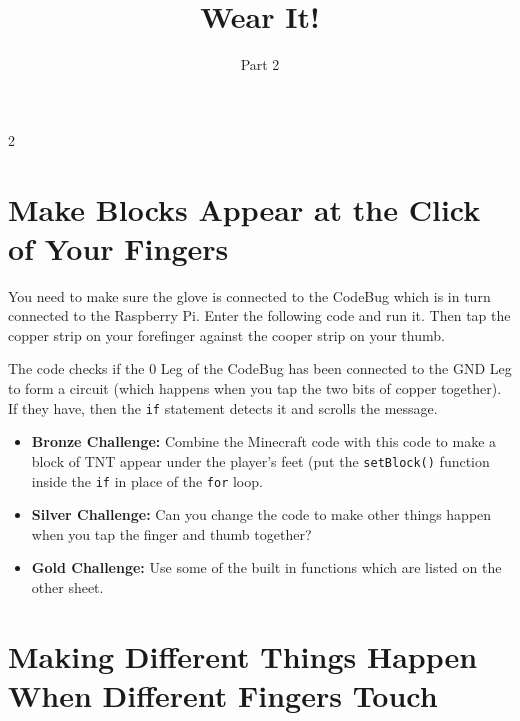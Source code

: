 \documentclass{geocraft-worksheet-multipage}
\begin{document}
\title{Wear It!}
\subtitle{Part 2}

\date{}

\maketitle

\setcounter {section} {2}

\section{Make Blocks Appear at the Click of  Your Fingers}
\lstset{language=Python}

You need to make sure the glove is connected to the CodeBug which is in turn connected to the Raspberry Pi. Enter the
following code and run it. Then tap the copper strip on your forefinger against the cooper strip on your thumb.

\noindent%
%
\vspace{0.2cm}
%
%

\noindent The code checks if the 0 Leg of the CodeBug has been connected to the GND Leg to form a circuit (which happens
when you tap the two bits of copper together). If they have, then the \lstinline{if} statement detects it and scrolls the
message.

\begin{itemize}
\item\textbf{Bronze Challenge:} Combine the Minecraft code with this code to make a block of TNT appear under the
  player's feet (put the \lstinline{setBlock()} function inside the \lstinline{if} in place of the \lstinline{for}
  loop. 
\item\textbf{Silver Challenge:} Can you change the code to make other things happen when you tap the finger and thumb
  together?
\item\textbf{Gold Challenge:} Use some of the built in functions which are listed on the other sheet.
\end{itemize}

\newpage

\section{Making Different Things Happen When Different Fingers Touch}

\noindent%
%
\vspace{0.2cm}
%
%
\end{document}
